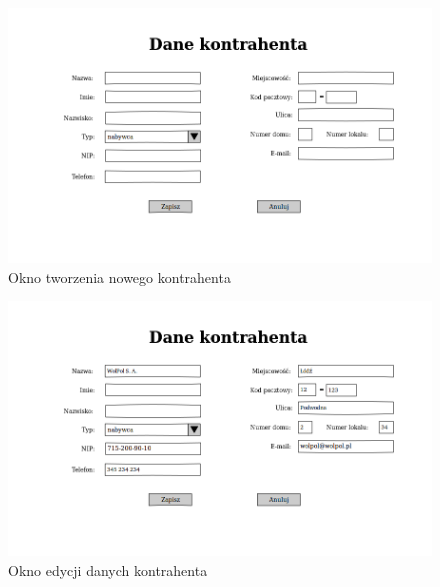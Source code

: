 \begin{figure}[!htb]
  \begin{center}
    \includegraphics[scale=0.45]{../img/interfejs/utworzenie-kontrahenta.png}
  \end{center}
  \caption{Okno tworzenia nowego kontrahenta}
\end{figure}
\FloatBarrier

\begin{figure}[!htb]
  \begin{center}
    \includegraphics[scale=0.45]{../img/interfejs/edycja-kontrahenta.png}
  \end{center}
  \caption{Okno edycji danych kontrahenta}
\end{figure}
\FloatBarrier

